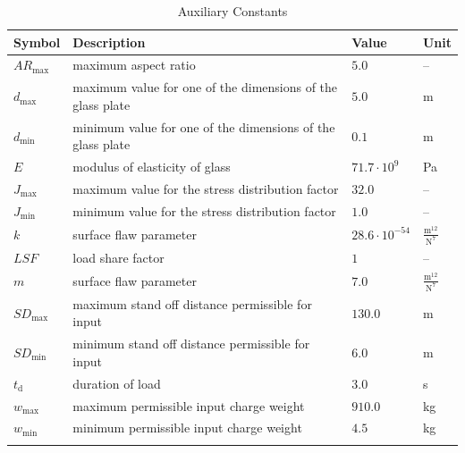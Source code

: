 \documentclass[12pt]{article}
\begin{document}
\begin{longtabu}{l X[l] l l}
\toprule
\textbf{Symbol} & \textbf{Description} & \textbf{Value} & \textbf{Unit}
\\
\midrule
\endhead
${AR_{\text{max}}}$ & maximum aspect ratio & $5.0$ & --
\\
${d_{\text{max}}}$ & maximum value for one of the dimensions of the glass plate & $5.0$ & m
\\
${d_{\text{min}}}$ & minimum value for one of the dimensions of the glass plate & $0.1$ & m
\\
$E$ & modulus of elasticity of glass & $71.7\cdot{}10^{9}$ & Pa
\\
${J_{\text{max}}}$ & maximum value for the stress distribution factor & $32.0$ & --
\\
${J_{\text{min}}}$ & minimum value for the stress distribution factor & $1.0$ & --
\\
$k$ & surface flaw parameter & $28.6\cdot{}10^{-54}$ & $\frac{\text{m}^{12}}{\text{N}^{7}}$
\\
$LSF$ & load share factor & $1$ & --
\\
$m$ & surface flaw parameter & $7.0$ & $\frac{\text{m}^{12}}{\text{N}^{7}}$
\\
${SD_{\text{max}}}$ & maximum stand off distance permissible for input & $130.0$ & m
\\
${SD_{\text{min}}}$ & minimum stand off distance permissible for input & $6.0$ & m
\\
${t_{\text{d}}}$ & duration of load & $3.0$ & s
\\
${w_{\text{max}}}$ & maximum permissible input charge weight & $910.0$ & kg
\\
${w_{\text{min}}}$ & minimum permissible input charge weight & $4.5$ & kg
\\
\bottomrule
\caption{Auxiliary Constants}
\label{Table:TAuxConsts}
\end{longtabu}
\end{document}

